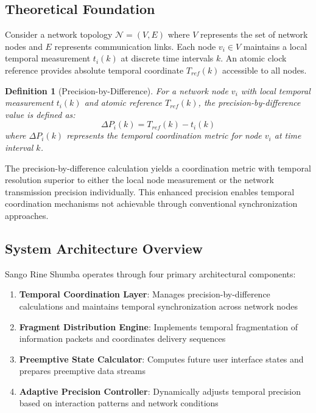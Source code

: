 \documentclass[12pt,a4paper]{article}
\newtheorem{definition}{Definition}
\begin{document}
\subsection{Theoretical Foundation}

Consider a network topology $\mathcal{N} = (V, E)$ where $V$ represents the set of network nodes and $E$ represents communication links. Each node $v_i \in V$ maintains a local temporal measurement $t_i(k)$ at discrete time intervals $k$. An atomic clock reference provides absolute temporal coordinate $T_{ref}(k)$ accessible to all nodes.

\begin{definition}[Precision-by-Difference]
For a network node $v_i$ with local temporal measurement $t_i(k)$ and atomic reference $T_{ref}(k)$, the precision-by-difference value is defined as:
\begin{equation}
\Delta P_i(k) = T_{ref}(k) - t_i(k)
\label{eq:precision_difference}
\end{equation}
where $\Delta P_i(k)$ represents the temporal coordination metric for node $v_i$ at time interval $k$.
\end{definition}

The precision-by-difference calculation yields a coordination metric with temporal resolution superior to either the local node measurement or the network transmission precision individually. This enhanced precision enables temporal coordination mechanisms not achievable through conventional synchronization approaches.

\subsection{System Architecture Overview}

Sango Rine Shumba operates through four primary architectural components:

\begin{enumerate}
\item \textbf{Temporal Coordination Layer}: Manages precision-by-difference calculations and maintains temporal synchronization across network nodes
\item \textbf{Fragment Distribution Engine}: Implements temporal fragmentation of information packets and coordinates delivery sequences
\item \textbf{Preemptive State Calculator}: Computes future user interface states and prepares preemptive data streams
\item \textbf{Adaptive Precision Controller}: Dynamically adjusts temporal precision based on interaction patterns and network conditions
\end{enumerate}
\end{document}
